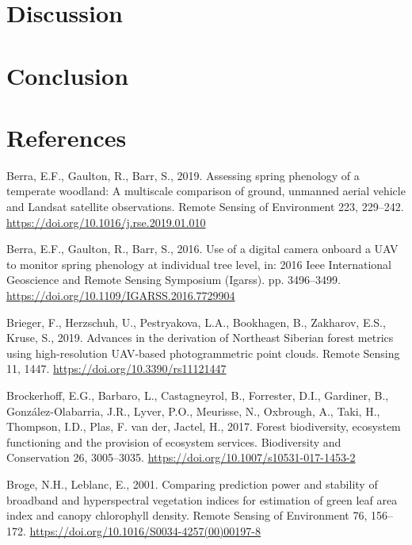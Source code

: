 \documentclass[]{article}
\begin{document}
\hypertarget{discussion}{%
\section{Discussion}\label{discussion}}

\hypertarget{conclusion}{%
\section{Conclusion}\label{conclusion}}

\hypertarget{references}{%
\section*{References}\label{references}}

\hypertarget{refs}{}
\leavevmode\hypertarget{ref-Berra2019}{}%
Berra, E.F., Gaulton, R., Barr, S., 2019. Assessing spring phenology of
a temperate woodland: A multiscale comparison of ground, unmanned aerial
vehicle and Landsat satellite observations. Remote Sensing of
Environment 223, 229--242.
\url{https://doi.org/10.1016/j.rse.2019.01.010}

\leavevmode\hypertarget{ref-Berra2016}{}%
Berra, E.F., Gaulton, R., Barr, S., 2016. Use of a digital camera
onboard a UAV to monitor spring phenology at individual tree level, in:
2016 Ieee International Geoscience and Remote Sensing Symposium
(Igarss). pp. 3496--3499.
\url{https://doi.org/10.1109/IGARSS.2016.7729904}

\leavevmode\hypertarget{ref-Brieger2019a}{}%
Brieger, F., Herzschuh, U., Pestryakova, L.A., Bookhagen, B., Zakharov,
E.S., Kruse, S., 2019. Advances in the derivation of Northeast Siberian
forest metrics using high-resolution UAV-based photogrammetric point
clouds. Remote Sensing 11, 1447.
\url{https://doi.org/10.3390/rs11121447}

\leavevmode\hypertarget{ref-Brockerhoff2017}{}%
Brockerhoff, E.G., Barbaro, L., Castagneyrol, B., Forrester, D.I.,
Gardiner, B., González-Olabarria, J.R., Lyver, P.O., Meurisse, N.,
Oxbrough, A., Taki, H., Thompson, I.D., Plas, F. van der, Jactel, H.,
2017. Forest biodiversity, ecosystem functioning and the provision of
ecosystem services. Biodiversity and Conservation 26, 3005--3035.
\url{https://doi.org/10.1007/s10531-017-1453-2}

\leavevmode\hypertarget{ref-Broge2001}{}%
Broge, N.H., Leblanc, E., 2001. Comparing prediction power and stability
of broadband and hyperspectral vegetation indices for estimation of
green leaf area index and canopy chlorophyll density. Remote Sensing of
Environment 76, 156--172.
\url{https://doi.org/10.1016/S0034-4257(00)00197-8}
\end{document}

